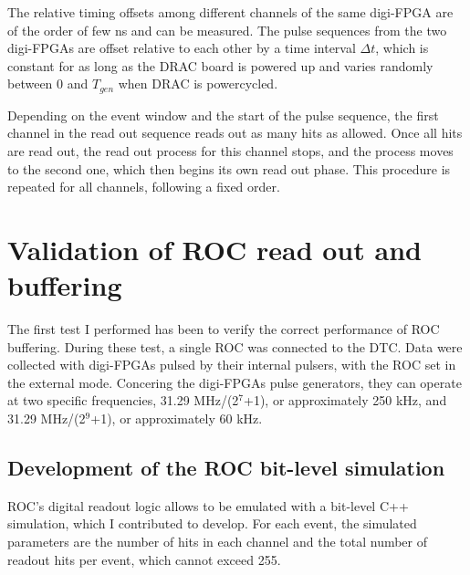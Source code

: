     The relative timing offsets among different channels of 
    the same digi-FPGA are of the order of few ns and can be 
    measured. The pulse sequences from the two digi-FPGAs are offset 
    relative to each other by a time interval $\Delta t$, which is 
    constant for as long as the DRAC board is 
    powered up and varies randomly between 0 and $T_{gen}$ when DRAC is powercycled.


    Depending on the event window and the start of the pulse 
    sequence, the first channel in the read out sequence 
    reads out as many hits as allowed. Once all hits are read out, 
    the read out process for this channel 
    stops, and the process moves to the second one, 
    which then begins its own read out phase. This procedure 
    is repeated for all channels, following a fixed order.
\section{Validation of ROC read out and buffering}
The first test I performed has been to verify the correct performance of 
ROC buffering.
During these test, a single ROC was connected to the DTC. 
Data were collected with digi-FPGAs pulsed by their internal pulsers, 
with the ROC set in the external mode. 
Concering the digi-FPGAs pulse generators, they can operate at two specific frequencies, 
31.29 MHz/(2$^7$+1), or approximately 250 kHz, 
and 31.29 MHz/(2$^9$+1), or approximately 60 kHz.
        
\subsection{Development of the ROC bit-level simulation}\label{MonteCarlo}
 
ROC's digital readout logic allows to be 
emulated with a bit-level C++ simulation, which I contributed to develop. 
For each event, the simulated parameters are the number of hits in each channel and the total 
number of readout hits per event, which cannot exceed 255. 



